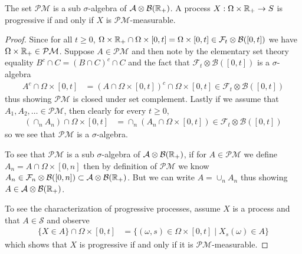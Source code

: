\begin{lem}The set $\mathcal{P}\mathcal{M}$ is a sub $\sigma$-algebra
  of $\mathcal{A} \otimes \mathcal{B}(\mathbb{R}_+)$.  A process $X :
  \Omega \times \mathbb{R}_+ \to S$ is progressive if and only if $X$ is  $\mathcal{P}\mathcal{M}$-measurable.
\end{lem}
\begin{proof}
Since for all $t\geq 0$, $\Omega \times \mathbb{R}_+ \cap \Omega \times
[0,t] = \Omega \times [0,t] \in \mathcal{F}_t  \otimes
\mathcal{B}([0,t])$ we have $\Omega \times \mathbb{R}_+ \in
\mathcal{P}\mathcal{M}$.  Suppose $A \in \mathcal{P}\mathcal{M}$ and
then note by the elementary set theory equality $B^c \cap C = (B \cap
C)^c \cap C$ and the fact that $\mathcal{F}_t \otimes
\mathcal{B}([0,t])$ is a $\sigma$-algebra
\begin{align*}
A^c \cap \Omega \times [0,t] &= (A \cap \Omega \times [0,t])^c \cap
\Omega \times [0,t] \in \mathcal{F}_t \otimes \mathcal{B}([0,t])
\end{align*}
thus showing $\mathcal{P}\mathcal{M}$ is closed under set complement.
Lastly if we assume that $A_1, A_2, \dots \in \mathcal{P}\mathcal{M}$,
then clearly  for every $t \geq 0$,
\begin{align*}
\left (\cap_n A_n \right )\cap \Omega \times [0,t] &= \cap_n \left (
  A_n \cap \Omega \times [0,t]\right ) \in \mathcal{F}_t \otimes \mathcal{B}([0,t])
\end{align*}
so we see that $\mathcal{P}\mathcal{M}$ is a $\sigma$-algebra.

To see that $\mathcal{P}\mathcal{M}$ is a sub $\sigma$-algebra of
$\mathcal{A} \otimes \mathcal{B}(\mathbb{R}_+)$, 
if for $A \in \mathcal{P}\mathcal{M}$ we define $A_n = A \cap \Omega
\times [0,n]$ then by definition of $\mathcal{P}\mathcal{M}$ we know
$A_n \in \mathcal{F}_n \otimes \mathcal{B}([0,n]) \subset \mathcal{A}
\otimes \mathcal{B}(\mathbb{R}_+)$.  But we can write $A = \cup_n A_n $
thus showing $A \in \mathcal{A}
\otimes \mathcal{B}(\mathbb{R}_+)$.

To see the characterization of progressive processes, assume $X$ is a
process and that $A
\in \mathcal{S}$ and observe
\begin{align*}
\lbrace X \in A \rbrace \cap \Omega \times [0,t] &= \lbrace (\omega,
s) \in \Omega \times [0,t] \mid X_s(\omega) \in A \rbrace
\end{align*}
which shows that $X$ is progressive if and only if it is $\mathcal{P}\mathcal{M}$-measurable.
\end{proof}
